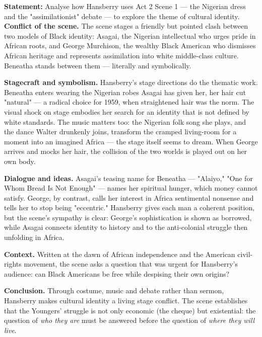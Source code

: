 \documentclass[11pt]{article}
\begin{document}
\begin{exoresolu}
\textbf{Statement:} Analyse how Hansberry uses Act 2 Scene 1 — the Nigerian dress and the "assimilationist" debate — to explore the theme of cultural identity.
\tcblower
\textbf{Conflict of the scene.} The scene stages a friendly but pointed clash between two models of Black identity: Asagai, the Nigerian intellectual who urges pride in African roots, and George Murchison, the wealthy Black American who dismisses African heritage and represents assimilation into white middle-class culture. Beneatha stands between them — literally and symbolically.

\textbf{Stagecraft and symbolism.} Hansberry's stage directions do the thematic work. Beneatha enters wearing the Nigerian robes Asagai has given her, her hair cut "natural" — a radical choice for 1959, when straightened hair was the norm. The visual shock on stage embodies her search for an identity that is not defined by white standards. The music matters too: the Nigerian folk song she plays, and the dance Walter drunkenly joins, transform the cramped living-room for a moment into an imagined Africa — the stage itself seems to dream. When George arrives and mocks her hair, the collision of the two worlds is played out on her own body.

\textbf{Dialogue and ideas.} Asagai's teasing name for Beneatha — "Alaiyo," "One for Whom Bread Is Not Enough" — names her spiritual hunger, which money cannot satisfy. George, by contrast, calls her interest in Africa sentimental nonsense and tells her to stop being "eccentric." Hansberry gives each man a coherent position, but the scene's sympathy is clear: George's sophistication is shown as borrowed, while Asagai connects identity to history and to the anti-colonial struggle then unfolding in Africa.

\textbf{Context.} Written at the dawn of African independence and the American civil-rights movement, the scene asks a question that was urgent for Hansberry's audience: can Black Americans be free while despising their own origins?

\textbf{Conclusion.} Through costume, music and debate rather than sermon, Hansberry makes cultural identity a living stage conflict. The scene establishes that the Youngers' struggle is not only economic (the cheque) but existential: the question of \emph{who they are} must be answered before the question of \emph{where they will live}.
\end{exoresolu}
\end{document}
